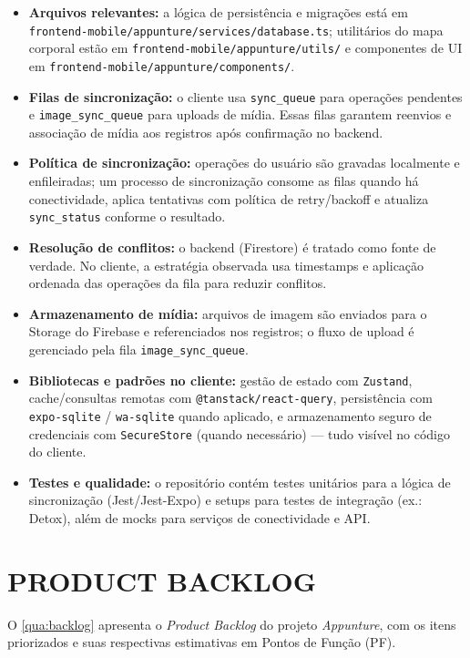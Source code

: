 \begin{itemize}
    \item \textbf{Arquivos relevantes:} a lógica de persistência e migrações está em \texttt{frontend-mobile/appunture/services/database.ts}; utilitários do mapa corporal estão em \texttt{frontend-mobile/appunture/utils/} e componentes de UI em \texttt{frontend-mobile/appunture/components/}.
    \item \textbf{Filas de sincronização:} o cliente usa \texttt{sync\_queue} para operações pendentes e \texttt{image\_sync\_queue} para uploads de mídia. Essas filas garantem reenvios e associação de mídia aos registros após confirmação no backend.
    \item \textbf{Política de sincronização:} operações do usuário são gravadas localmente e enfileiradas; um processo de sincronização consome as filas quando há conectividade, aplica tentativas com política de retry/backoff e atualiza \texttt{sync\_status} conforme o resultado.
    \item \textbf{Resolução de conflitos:} o backend (Firestore) é tratado como fonte de verdade. No cliente, a estratégia observada usa timestamps e aplicação ordenada das operações da fila para reduzir conflitos.
    \item \textbf{Armazenamento de mídia:} arquivos de imagem são enviados para o Storage do Firebase e referenciados nos registros; o fluxo de upload é gerenciado pela fila \texttt{image\_sync\_queue}.
    \item \textbf{Bibliotecas e padrões no cliente:} gestão de estado com \texttt{Zustand}, cache/consultas remotas com \texttt{@tanstack/react-query}, persistência com \texttt{expo-sqlite} / \texttt{wa-sqlite} quando aplicado, e armazenamento seguro de credenciais com \texttt{SecureStore} (quando necessário) — tudo visível no código do cliente.
    \item \textbf{Testes e qualidade:} o repositório contém testes unitários para a lógica de sincronização (Jest/Jest-Expo) e setups para testes de integração (ex.: Detox), além de mocks para serviços de conectividade e API.
\end{itemize}

\section{PRODUCT BACKLOG} \label{sec:backlog}

O \autoref{qua:backlog} apresenta o \textit{Product Backlog} do projeto \textit{Appunture}, com os itens priorizados e suas respectivas estimativas em Pontos de Função (PF).

